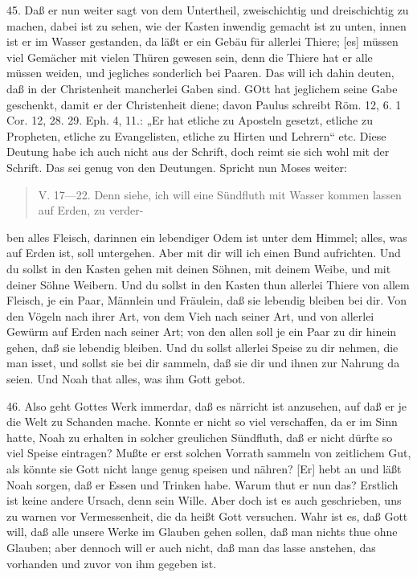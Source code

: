 45. Daß er nun weiter sagt von dem Untertheil, zweischichtig und dreischichtig zu machen, dabei ist zu sehen, wie der Kasten inwendig gemacht ist zu unten, innen ist er im Wasser gestanden, da läßt er ein Gebäu für allerlei Thiere; [es] müssen viel Gemächer mit vielen Thüren gewesen sein, denn die Thiere hat er alle müssen weiden, und jegliches sonderlich bei Paaren. Das will ich dahin deuten, daß in der Christenheit mancherlei Gaben sind. GOtt hat jeglichem seine Gabe geschenkt, damit er der Christenheit diene; davon Paulus schreibt Röm. 12, 6. 1 Cor. 12, 28. 29. Eph. 4, 11.: „Er hat etliche zu Aposteln gesetzt, etliche zu Propheten, etliche zu Evangelisten, etliche zu Hirten und Lehrern“ etc. Diese Deutung habe ich auch nicht aus der Schrift, doch reimt sie sich wohl mit der Schrift. Das sei genug von den Deutungen. Spricht nun Moses weiter:

\begin{quote}
V. 17—22. Denn siehe, ich will eine Sündfluth mit Wasser kommen lassen auf Erden, zu verder-
\end{quote}
ben alles Fleisch, darinnen ein lebendiger Odem ist unter dem Himmel; alles, was auf Erden ist, soll untergehen. Aber mit dir will ich einen Bund aufrichten. Und du sollst in den Kasten gehen mit deinen Söhnen, mit deinem Weibe, und mit deiner Söhne Weibern. Und du sollst in den Kasten thun allerlei Thiere von allem Fleisch, je ein Paar, Männlein und Fräulein, daß sie lebendig bleiben bei dir. Von den Vögeln nach ihrer Art, von dem Vieh nach seiner Art, und von allerlei Gewürm auf Erden nach seiner Art; von den allen soll je ein Paar zu dir hinein gehen, daß sie lebendig bleiben. Und du sollst allerlei Speise zu dir nehmen, die man isset, und sollst sie bei dir sammeln, daß sie dir und ihnen zur Nahrung da seien. Und Noah that alles, was ihm Gott gebot.

46. Also geht Gottes Werk immerdar, daß es närricht ist anzusehen, auf daß er je die Welt zu Schanden mache. Konnte er nicht so viel verschaffen, da er im Sinn hatte, Noah zu erhalten in solcher greulichen Sündfluth, daß er nicht dürfte so viel Speise eintragen? Mußte er erst solchen Vorrath sammeln von zeitlichem Gut, als könnte sie Gott nicht lange genug speisen und nähren? [Er] hebt an und läßt Noah sorgen, daß er Essen und Trinken habe. Warum thut er nun das? Erstlich ist keine andere Ursach, denn sein Wille. Aber doch ist es auch geschrieben, uns zu warnen vor Vermessenheit, die da heißt Gott versuchen. Wahr ist es, daß Gott will, daß alle unsere Werke im Glauben gehen sollen, daß man nichts thue ohne Glauben; aber dennoch will er auch nicht, daß man das lasse anstehen, das vorhanden und zuvor von ihm gegeben ist.


